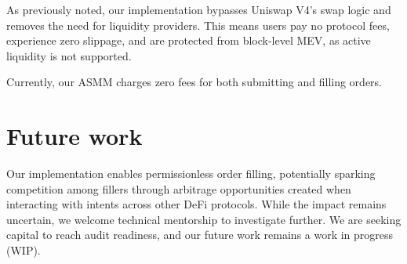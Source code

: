 \documentclass[bibliography=numbered]{article}
\begin{document}
As previously noted, our implementation bypasses Uniswap V4’s swap logic and removes the need for liquidity providers. This means users pay no protocol fees, experience zero slippage, and are protected from block-level MEV, as active liquidity is not supported.

Currently, our ASMM charges zero fees for both submitting and filling orders.

\section{Future work}

Our implementation enables permissionless order filling, potentially sparking competition among fillers through arbitrage opportunities created when interacting with intents across other DeFi protocols. While the impact remains uncertain, we welcome technical mentorship to investigate further. We are seeking capital to reach audit readiness, and our future work remains a work in progress (WIP).

\printbibliography %
\end{document}
